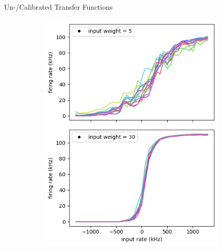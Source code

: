 \documentclass[12pt, aspectratio=169]{beamer}
\begin{document}
\begin{frame}{Un-/Calibrated Transfer Functions}
\begin{figure}[!htb]
\begin{figure}
                \includegraphics[scale=0.44]{mfp/calibrated_activation_function_input.png}
                \label{membrane_potential}
            \end{figure}
        \endminipage\hfill
    \end{figure}
\end{frame}
\end{document}
